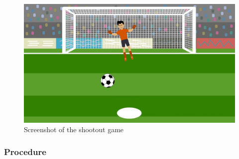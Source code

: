 \documentclass[
  english,
  man,floatsintext]{apa6}
\begin{document}
\begin{figure}

{\centering \includegraphics[width=6.4in]{images/shootout} 

}

\caption{Screenshot of the shootout game}\label{fig:screenshot-shootout}
\end{figure}

\hypertarget{procedure-1}{%
\subsubsection{Procedure}\label{procedure-1}}
\end{document}
